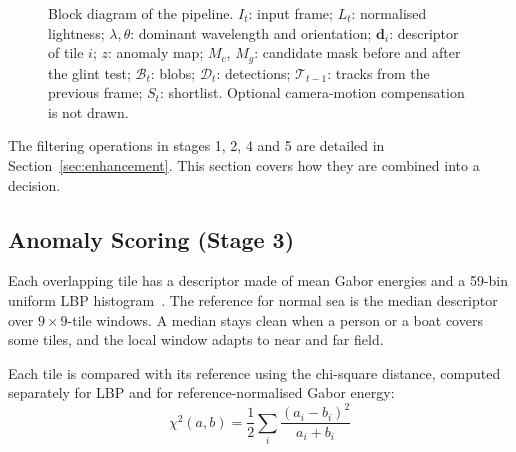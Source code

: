 \documentclass[11pt,a4paper]{article}
\begin{document}
\begin{figure}[H]
{%
}
\caption{Block diagram of the pipeline. $I_t$: input frame; $L_t$: normalised lightness; $\lambda,\theta$: dominant wavelength and orientation; $\mathbf{d}_i$: descriptor of tile $i$; $z$: anomaly map; $M_c$, $M_g$: candidate mask before and after the glint test; $\mathcal{B}_t$: blobs; $\mathcal{D}_t$: detections; $\mathcal{T}_{t-1}$: tracks from the previous frame; $S_t$: shortlist. Optional camera-motion compensation is not drawn.}
\label{fig:pipeline}
\end{figure}

The filtering operations in stages 1, 2, 4 and 5 are detailed in Section~\ref{sec:enhancement}. This section covers how they are combined into a decision.

\subsection{Anomaly Scoring (Stage 3)}

Each overlapping tile has a descriptor made of mean Gabor energies and a 59-bin uniform LBP histogram~\cite{ojala}. The reference for normal sea is the median descriptor over $9 \times 9$-tile windows. A median stays clean when a person or a boat covers some tiles, and the local window adapts to near and far field.

Each tile is compared with its reference using the chi-square distance, computed separately for LBP and for reference-normalised Gabor energy:
\begin{equation}
\chi^2(a, b) = \frac{1}{2} \sum_i \frac{(a_i - b_i)^2}{a_i + b_i}
\end{equation}
\end{document}

